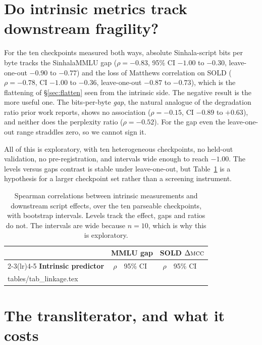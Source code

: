 \documentclass{article}
\makeatletter
\newcommand{\mcc}{\textsc{mcc}}
\newcommand{\rows}[1]{\@@input #1 }
\makeatother
\begin{document}
\section{Do intrinsic metrics track downstream fragility?}
\label{sec:linkage}

For the ten checkpoints measured both ways, absolute Sinhala-script bits per byte
tracks the SinhalaMMLU gap ($\rho = -0.83$, 95\% CI $-1.00$ to $-0.30$,
leave-one-out $-0.90$ to $-0.77$) and the loss of Matthews correlation on SOLD
($\rho = -0.78$, CI $-1.00$ to $-0.36$, leave-one-out $-0.87$ to $-0.73$), which is
the flattening of \S\ref{sec:flatten} seen from the intrinsic side. The negative
result is the more useful one. The bits-per-byte \emph{gap}, the natural analogue of
the degradation ratio prior work reports, shows no association ($\rho = -0.15$, CI
$-0.89$ to $+0.63$), and neither does the perplexity ratio ($\rho = -0.52$). For the
gap even the leave-one-out range straddles zero, so we cannot sign it.

All of this is exploratory, with ten heterogeneous checkpoints, no held-out validation, no
pre-registration, and intervals wide enough to reach $-1.00$. The levels versus gaps
contrast is stable under leave-one-out, but Table~\ref{tab:linkage} is a hypothesis
for a larger checkpoint set rather than a screening instrument.

\begin{table}[t]
\caption{Spearman correlations between intrinsic measurements and downstream script
effects, over the ten parseable checkpoints, with bootstrap intervals. Levels track
the effect, gaps and ratios do not. The intervals are wide because $n = 10$, which is
why this is exploratory.}
\label{tab:linkage}
\centering\small
\setlength{\tabcolsep}{3pt}
\begin{tabular}{@{}l r@{~}l r@{~}l@{}}
\toprule
& \multicolumn{2}{c}{\textbf{MMLU gap}} & \multicolumn{2}{c}{\textbf{SOLD} $\Delta\mcc$} \\
\cmidrule(lr){2-3}\cmidrule(lr){4-5}
\textbf{Intrinsic predictor} & $\rho$ & 95\% CI & $\rho$ & 95\% CI \\
\midrule
\rows{tables/tab_linkage.tex}
\bottomrule
\end{tabular}
\end{table}

\section{The transliterator, and what it costs}
\label{sec:translit}
\end{document}

